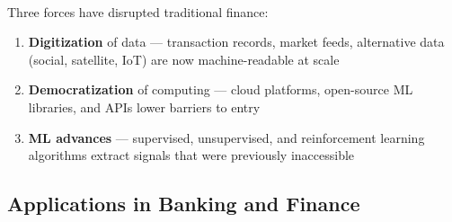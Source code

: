 \begin{tcbitemize}[ skin=sectionraster ]
    \tcbitem[title=Revolution in Financial Services, raster multicolumn=3]
    Three forces have disrupted traditional finance\textsuperscript{\cite[][pp.~1--2]{jansenMachineLearningAlgorithmic2020}}:
    \tcblower
    \begin{enumerate}
        \item \textbf{Digitization} of data — transaction records, market feeds, alternative data (social, satellite, IoT) are now machine-readable at scale
        \item \textbf{Democratization} of computing — cloud platforms, open-source ML libraries, and APIs lower barriers to entry
        \item \textbf{ML advances} — supervised, unsupervised, and reinforcement learning algorithms extract signals that were previously inaccessible
    \end{enumerate}

\end{tcbitemize}

\subsection{Applications in Banking and Finance}

